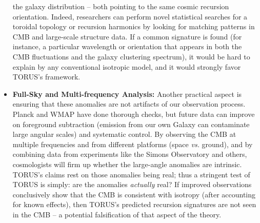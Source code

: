 \documentclass[
]{article}
\begin{document}
\begin{itemize}
  the galaxy distribution -- both pointing to the same cosmic recursion
  orientation. Indeed, researchers can perform novel statistical
  searches for a toroidal topology or recursion harmonics by looking for
  matching patterns in CMB and large-scale structure data. If a common
  signature is found (for instance, a particular wavelength or
  orientation that appears in both the CMB fluctuations and the galaxy
  clustering spectrum), it would be hard to explain by any conventional
  isotropic model, and it would strongly favor TORUS's framework.
\item
  \textbf{Full-Sky and Multi-frequency Analysis:} Another practical
  aspect is ensuring that these anomalies are not artifacts of our
  observation process. Planck and WMAP have done thorough checks, but
  future data can improve on foreground subtraction (emission from our
  own Galaxy can contaminate large angular scales) and systematic
  control. By observing the CMB at multiple frequencies and from
  different platforms (space \emph{vs.} ground), and by combining data
  from experiments like the Simons Observatory and others, cosmologists
  will firm up whether the large-angle anomalies are intrinsic. TORUS's
  claims rest on those anomalies being real; thus a stringent test of
  TORUS is simply: are the anomalies \emph{actually} real? If improved
  observations conclusively show that the CMB is consistent with
  isotropy (after accounting for known effects), then TORUS's predicted
  recursion signatures are not seen in the CMB -- a potential
  falsification of that aspect of the theory.
\end{itemize}
\end{document}
